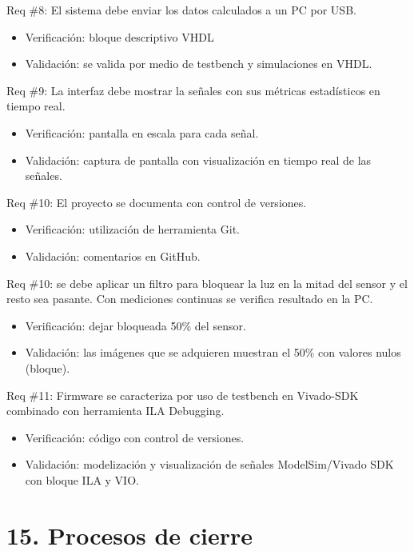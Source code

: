 \documentclass[
11pt, %
codirector, %
]{charter}
\begin{document}
Req \#8: El sistema debe enviar los datos calculados a un PC por USB.
\begin{itemize}
\item Verificación: bloque descriptivo VHDL
\item Validación: se valida por medio de testbench y simulaciones en VHDL.
\end{itemize}

Req \#9: La interfaz debe mostrar la señales con sus métricas estadísticos en tiempo real.
\begin{itemize}
\item Verificación: pantalla en escala para cada señal.
\item Validación: captura de pantalla con visualización en tiempo real de las señales.
\end{itemize}

Req \#10: El proyecto se documenta con control de versiones. 
\begin{itemize}
\item Verificación: utilización de herramienta Git.
\item Validación: comentarios en GitHub.
\end{itemize}

Req \#10: se debe aplicar un filtro para bloquear la luz en la mitad del sensor y el resto sea pasante. Con mediciones continuas se verifica resultado en la PC.
\begin{itemize}
\item Verificación: dejar bloqueada 50\% del sensor.
\item Validación: las imágenes que se adquieren muestran el 50\% con valores nulos (bloque).
\end{itemize}

Req \#11: Firmware se caracteriza por uso de testbench en Vivado-SDK combinado con herramienta ILA Debugging.
\begin{itemize}
\item Verificación: código con control de versiones.
\item Validación: modelización y visualización de señales ModelSim/Vivado SDK con bloque ILA y VIO.
\end{itemize}

\section{15. Procesos de cierre}    
\label{sec:cierre}
\end{document}
